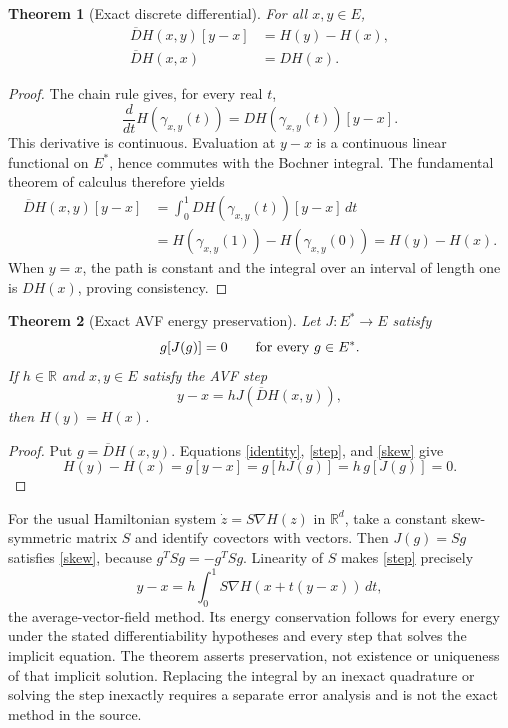 \documentclass[10pt]{article}
\newtheorem{theorem}{Theorem}
\begin{document}
\begin{theorem}[Exact discrete differential]
For all $x,y\in E$,
\begin{align}
 \overline{D}H(x,y)[y-x]&=H(y)-H(x),\label{identity}\\
 \overline{D}H(x,x)&=DH(x).\label{consistency}
\end{align}
\end{theorem}
\begin{proof}
The chain rule gives, for every real $t$,
\[
 \frac{d}{dt}H(\gamma_{x,y}(t))
   =DH(\gamma_{x,y}(t))[y-x].
\]
This derivative is continuous. Evaluation at $y-x$ is a continuous linear
functional on $E^*$, hence commutes with the Bochner integral. The
fundamental theorem of calculus therefore yields
\begin{align*}
 \overline{D}H(x,y)[y-x]
 &=\int_0^1DH(\gamma_{x,y}(t))[y-x]\,dt\\
 &=H(\gamma_{x,y}(1))-H(\gamma_{x,y}(0))
  =H(y)-H(x).
\end{align*}
When $y=x$, the path is constant and the integral over an interval of
length one is $DH(x)$, proving consistency.
\end{proof}

\begin{theorem}[Exact AVF energy preservation]
Let $J:E^*\to E$ satisfy
\begin{equation}\label{skew}
 g[J(g)]=0\qquad\hbox{for every }g\in E^*.
\end{equation}
If $h\in\mathbb R$ and $x,y\in E$ satisfy the AVF step
\begin{equation}\label{step}
 y-x=hJ(\overline{D}H(x,y)),
\end{equation}
then $H(y)=H(x)$.
\end{theorem}
\begin{proof}
Put $g=\overline{D}H(x,y)$. Equations \eqref{identity}, \eqref{step},
and \eqref{skew} give
\[
 H(y)-H(x)=g[y-x]=g[hJ(g)]=h\,g[J(g)]=0.
\]
\end{proof}

For the usual Hamiltonian system $\dot z=S\nabla H(z)$ in
$\mathbb R^d$, take a constant skew-symmetric matrix $S$ and identify
covectors with vectors. Then $J(g)=Sg$ satisfies \eqref{skew}, because
$g^T Sg=-g^T Sg$. Linearity of $S$ makes \eqref{step} precisely
\[
 y-x=h\int_0^1 S\nabla H(x+t(y-x))\,dt,
\]
the average-vector-field method. Its energy conservation follows for
every energy under the stated differentiability hypotheses and every
step that solves the implicit equation. The theorem asserts preservation,
not existence or uniqueness of that implicit solution. Replacing the
integral by an inexact quadrature or solving the step inexactly requires
a separate error analysis and is not the exact method in the source.
\end{document}
